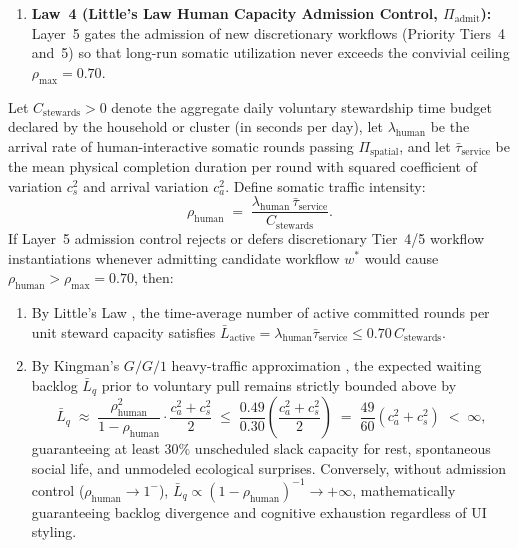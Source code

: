 \begin{definition}
\begin{enumerate}
  \item \textbf{Law~4 (Little's Law Human Capacity Admission Control, $\Pi_{\text{admit}}$):} Layer~5 gates the admission of new discretionary workflows (Priority Tiers~4 and~5) so that long-run somatic utilization never exceeds the convivial ceiling $\rho_{\max} = 0.70$.
\end{enumerate}
\end{definition}

\begin{theorem}
\label{thm:littles-law-calm}
Let $C_{\text{stewards}} > 0$ denote the aggregate daily voluntary stewardship time budget declared by the household or cluster (in seconds per day), let $\lambda_{\text{human}}$ be the arrival rate of human-interactive somatic rounds passing $\Pi_{\text{spatial}}$, and let $\bar{\tau}_{\text{service}}$ be the mean physical completion duration per round with squared coefficient of variation $c_s^2$ and arrival variation $c_a^2$. Define somatic traffic intensity:
\begin{equation}
\label{eq:human-utilization}
\rho_{\text{human}} \;=\; \frac{\lambda_{\text{human}} \, \bar{\tau}_{\text{service}}}{C_{\text{stewards}}}.
\end{equation}
If Layer~5 admission control rejects or defers discretionary Tier~4/5 workflow instantiations whenever admitting candidate workflow $w^*$ would cause $\rho_{\text{human}} > \rho_{\max} = 0.70$, then:
\begin{enumerate}
  \item By Little's Law \parencite{little1961proof}, the time-average number of active committed rounds per unit steward capacity satisfies $\bar{L}_{\text{active}} = \lambda_{\text{human}} \bar{\tau}_{\text{service}} \le 0.70 \, C_{\text{stewards}}$.
  \item By Kingman's $G/G/1$ heavy-traffic approximation \parencite{kleinrock1975queueing}, the expected waiting backlog $\bar{L}_q$ prior to voluntary pull remains strictly bounded above by
  \[
    \bar{L}_q \;\approx\; \frac{\rho_{\text{human}}^2}{1 - \rho_{\text{human}}} \cdot \frac{c_a^2 + c_s^2}{2} \;\le\; \frac{0.49}{0.30}\left(\frac{c_a^2 + c_s^2}{2}\right) \;=\; \frac{49}{60}(c_a^2 + c_s^2) \;<\; \infty,
  \]
  guaranteeing at least $30\%$ unscheduled slack capacity for rest, spontaneous social life, and unmodeled ecological surprises. Conversely, without admission control ($\rho_{\text{human}} \to 1^{-}$), $\bar{L}_q \propto (1 - \rho_{\text{human}})^{-1} \to +\infty$, mathematically guaranteeing backlog divergence and cognitive exhaustion regardless of UI styling.
\end{enumerate}
\end{theorem}

